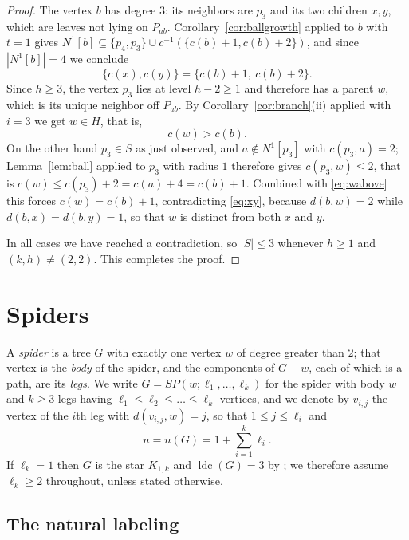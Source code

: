 \documentclass[reqno,10pt]{article}
\theoremstyle{definition}
\numberwithin{equation}{section}
\numberwithin{theorem}{section}
\newcommand{\ldc}{\operatorname{ldc}}
\newcommand{\Ball}[2]{N^{#2}[#1]}
\begin{document}
\begin{proof}
The vertex $b$ has degree $3$: its neighbors are $p_3$ and its two children
$x,y$, which are leaves not lying on $P_{ab}$. Corollary~\ref{cor:ballgrowth}
applied to $b$ with $t=1$ gives
$\Ball{b}{1}\subseteq\{p_4,p_3\}\cup c^{-1}(\{c(b)+1,c(b)+2\})$, and since
$|\Ball{b}{1}|=4$ we conclude
\begin{equation}
  \{c(x),c(y)\}=\{c(b)+1,\ c(b)+2\}.
  \label{eq:xy}
\end{equation}
Since $h\ge3$, the vertex $p_3$ lies at level $h-2\ge1$ and therefore has a
parent $w$, which is its unique neighbor off $P_{ab}$. By
Corollary~\ref{cor:branch}(ii) applied with $i=3$ we get $w\in H$, that is,
\begin{equation}
  c(w)>c(b).
  \label{eq:wabove}
\end{equation}
On the other hand $p_3\in S$ as just observed, and $a\notin\Ball{p_3}{1}$
with $c(p_3,a)=2$; Lemma~\ref{lem:ball} applied to $p_3$ with radius $1$
therefore gives $c(p_3,w)\le2$, that is $c(w)\le c(p_3)+2=c(a)+4=c(b)+1$.
Combined with \eqref{eq:wabove} this forces $c(w)=c(b)+1$, contradicting
\eqref{eq:xy}, because $d(b,w)=2$ while $d(b,x)=d(b,y)=1$, so that $w$ is
distinct from both $x$ and $y$.

\smallskip
In all cases we have reached a contradiction, so $|S|\le3$ whenever $h\ge1$ and
$(k,h)\ne(2,2)$. This completes the proof.
\end{proof}

\section{Spiders}
\label{sec:spiders}

A \emph{spider} is a tree $G$ with exactly one vertex $w$ of degree greater
than $2$; that vertex is the \emph{body} of the spider, and the components of
$G-w$, each of which is a path, are its \emph{legs}. We write
$G=SP(w;\ell_1,\dots,\ell_k)$ for the spider with body $w$ and $k\ge3$ legs
having $\ell_1\le\ell_2\le\dots\le\ell_k$ vertices, and we denote by $v_{i,j}$
the vertex of the $i$th leg with $d(v_{i,j},w)=j$, so that
$1\le j\le\ell_i$ and
\[
  n=n(G)=1+\sum_{i=1}^{k}\ell_i .
\]
If $\ell_k=1$ then $G$ is the star $K_{1,k}$ and $\ldc(G)=3$ by
\cite[Proposition 4.4]{CH2025}; we therefore assume $\ell_k\ge2$ throughout,
unless stated otherwise.

\subsection{The natural labeling}
\end{document}
